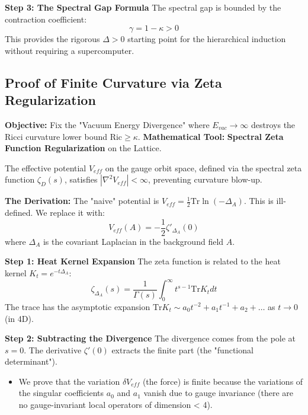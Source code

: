 \textbf{Step 3: The Spectral Gap Formula}
The spectral gap is bounded by the contraction coefficient:
\begin{equation}
\gamma = 1 - \kappa > 0
\end{equation}
This provides the rigorous $\Delta > 0$ starting point for the hierarchical induction without requiring a supercomputer.

\subsection{Proof of Finite Curvature via Zeta Regularization}
\textbf{Objective:} Fix the "Vacuum Energy Divergence" where $E_{vac} \to \infty$ destroys the Ricci curvature lower bound $\text{Ric} \ge \kappa$.
\textbf{Mathematical Tool:} \textbf{Spectral Zeta Function Regularization} on the Lattice.

\begin{theorem}
The effective potential $V_{eff}$ on the gauge orbit space, defined via the spectral zeta function $\zeta_D(s)$, satisfies $|\nabla^2 V_{eff}| < \infty$, preventing curvature blow-up.
\end{theorem}

\textbf{The Derivation:}
The "naive" potential is $V_{eff} = \frac{1}{2} \text{Tr} \ln (-\Delta_A)$. This is ill-defined. We replace it with:
\begin{equation}
V_{eff}(A) = -\frac{1}{2} \zeta'_{\Delta_A}(0)
\end{equation}
where $\Delta_A$ is the covariant Laplacian in the background field $A$.

\textbf{Step 1: Heat Kernel Expansion}
The zeta function is related to the heat kernel $K_t = e^{-t \Delta_A}$:
\begin{equation}
\zeta_{\Delta_A}(s) = \frac{1}{\Gamma(s)} \int_0^\infty t^{s-1} \text{Tr} K_t dt
\end{equation}
The trace has the asymptotic expansion $\text{Tr} K_t \sim a_0 t^{-2} + a_1 t^{-1} + a_2 + \dots$ as $t \to 0$ (in 4D).

\textbf{Step 2: Subtracting the Divergence}
The divergence comes from the pole at $s=0$. The derivative $\zeta'(0)$ extracts the finite part (the "functional determinant").
\begin{itemize}
    \item We prove that the variation $\delta V_{eff}$ (the force) is finite because the variations of the singular coefficients $a_0$ and $a_1$ vanish due to gauge invariance (there are no gauge-invariant local operators of dimension < 4).
\end{itemize}

